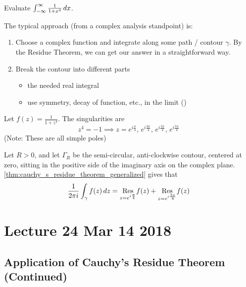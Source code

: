 \documentclass[11pt, oneside]{book}
\begin{document}
\begin{ex}
  Evaluate $\int_{-\infty}^{\infty} \frac{1}{1 + x^4} \dif{x}$.

  The typical approach (from a complex analysis standpoint) is:
  \begin{enumerate}
    \item Choose a complex function and integrate along some path / contour $\gamma$. By the Residue Theorem, we can get our answer in a straightforward way.
    \item Break the contour into different parts
    \begin{itemize}
      \item the needed real integral
      \item use symmetry, decay of function, etc., in the limit ()
    \end{itemize}
  \end{enumerate}

  Let $f(z) = \frac{1}{1 + z^4}$. The singularities are
  \begin{equation*}
    z^4 = -1 \implies z = e^{i \frac{\pi}{4}}, \, e^{i \frac{3 \pi}{4}}, \, e^{i \frac{5 \pi}{4} }, \, e^{i \frac{7 \pi}{4} }
  \end{equation*}
  (Note: These are all simple poles)

  Let $R > 0$, and let $\Gamma_R$ be the semi-circular, anti-clockwise contour, centered at zero, sitting in the positive side of the imaginary axis on the complex plane. \cref{thm:cauchy_s_residue_theorem_generalized} gives that
  \begin{equation*}
    \frac{1}{2 \pi i} \int_{\gamma} f(z) \dif{z} = \res{f(z)}{z = e^{i \frac{\pi}{4} }} + \res{f(z)}{z = e^{i \frac{3 \pi}{4} }}
  \end{equation*}
\end{ex}



\chapter{Lecture 24 Mar 14 2018}
  \label{chapter:lecture_24_mar_14_2018}

\section{Application of Cauchy's Residue Theorem (Continued)} %
\label{sec:application_of_cauchy_s_residue_theorem_continued}
\end{document}
